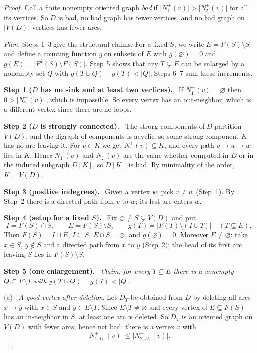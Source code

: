 \documentclass[11pt]{article}
\theoremstyle{remark}
\newcommand{\abs}[1]{\lvert #1\rvert}
\newcommand{\step}[1]{\par\medskip\noindent\textbf{Step #1.}\ }
\newcommand{\substep}[1]{\par\smallskip\noindent\textup{(#1)}\ }
\begin{document}
\begin{proof}
Call a finite nonempty oriented graph \emph{bad} if
$\abs{N_1^+(v)}>\abs{N_2^+(v)}$ for all its vertices. So $D$ is bad, no bad
graph has fewer vertices, and no bad graph on $\abs{V(D)}$ vertices has fewer
arcs.

\emph{Plan.} Steps 1--3 give the structural claims. For a fixed $S$, we write
$E=F(S)\setminus S$ and define a counting function $g$ on subsets of $E$
with $g(\varnothing)=0$ and $g(E)=\abs{F^2(S)\setminus F(S)}$. Step~5 shows
that any $T\subsetneq E$ can be enlarged by a nonempty set $Q$ with
$g(T\cup Q)-g(T)<\abs Q$; Steps 6--7 sum these increments.

\step{1 ($D$ has no sink and at least two vertices)}
If $N_1^+(v)=\varnothing$ then $0>\abs{N_2^+(v)}$, which is impossible. So
every vertex has an out-neighbor, which is a different vertex since there are
no loops.

\step{2 ($D$ is strongly connected)}
The strong components of $D$ partition $V(D)$, and the digraph of components
is acyclic, so some strong component $K$ has no arc leaving it. For $v\in K$
we get $N_1^+(v)\subseteq K$, and every path $v\to u\to w$ lies in $K$. Hence
$N_1^+(v)$ and $N_2^+(v)$ are the same whether computed in $D$ or in the
induced subgraph $D[K]$, so $D[K]$ is bad. By minimality of the order,
$K=V(D)$.

\step{3 (positive indegrees)}
Given a vertex $w$, pick $v\ne w$ (Step~1). By Step~2 there is a directed path
from $v$ to $w$; its last arc enters $w$.

\step{4 (setup for a fixed $S$)}
Fix $\varnothing\ne S\subsetneq V(D)$ and put
\[
  I=F(S)\cap S,\qquad E=F(S)\setminus S,
  \qquad g(T)=\abs{F(T)\setminus(I\cup T)}\quad(T\subseteq E).
\]
Then $F(S)=I\sqcup E$, $I\subseteq S$, $E\cap S=\varnothing$, and
$g(\varnothing)=0$. Moreover $E\ne\varnothing$: take $x\in S$, $y\notin S$ and
a directed path from $x$ to $y$ (Step~2); the head of its first arc leaving
$S$ lies in $F(S)\setminus S$.

\step{5 (one enlargement)}
\emph{Claim: for every $T\subsetneq E$ there is a nonempty
$Q\subseteq E\setminus T$ with $g(T\cup Q)-g(T)<\abs Q$.}

\substep{a} \emph{A good vertex after deletion.}
Let $D_T$ be obtained from $D$ by deleting all arcs $x\to y$ with $x\in S$ and
$y\in E\setminus T$. Since $E\setminus T\neq\varnothing$ and every vertex of
$E\subseteq F(S)$ has an in-neighbor in $S$, at least one arc is deleted.
So $D_T$ is an oriented graph on $V(D)$ with fewer arcs, hence not bad: there
is a vertex $v$ with
\begin{equation}\label{eq:good-after-deletion}
 \abs{N_{1,D_T}^+(v)}\le\abs{N_{2,D_T}^+(v)} .
\end{equation}


\end{proof}
\end{document}
